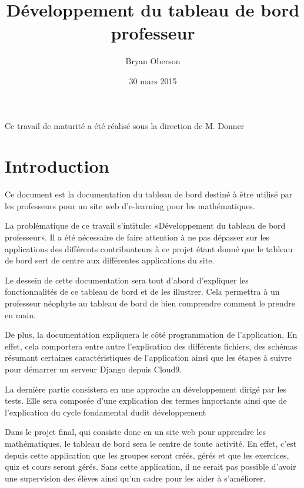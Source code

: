 \documentclass[a4paper,10pt,french]{sphinxmanual}
\title{Développement du tableau de bord professeur}
\date{30 mars 2015}
\author{Bryan Oberson}
\begin{document}
\maketitle
\tableofcontents
{}\label{index::doc}\begin{center}
Ce travail de maturité a été réalisé sous la direction de M. Donner
\end{center}

\setcounter{page}{2}

\chapter{Introduction}
\label{intro:introduction}\label{intro::doc}\label{intro:developpement-du-tableau-de-bord-professeur}
Ce document est la documentation du tableau de bord destiné à
être utilisé par les professeurs pour un site web d'e-learning pour les
mathématiques.

La problématique de ce travail s'intitule: «Développement du tableau de bord
professeur». Il a été nécessaire de faire attention à ne pas dépasser sur les
applications des différents contribuateurs à ce projet étant donné que le
tableau de bord sert de centre aux différentes applications du site.

Le dessein de cette documentation sera tout d'abord d'expliquer les
fonctionnalités de ce tableau de bord et de les illustrer. Cela permettra à un
professeur néophyte au tableau de bord de bien comprendre comment le prendre en
main.

De plus, la documentation expliquera le côté programmation de l'application.
En effet, cela comportera entre autre l'explication des différents fichiers, des
schémas résumant certaines caractéristiques de l'application ainsi que les
étapes à suivre pour démarrer un serveur Django depuis Cloud9.

La dernière partie consistera en une approche au développement dirigé par les
tests. Elle sera composée d'une explication des termes importants ainsi que de
l'explication du cycle fondamental dudit développement

Dans le projet final, qui consiste donc en un site web pour apprendre les
mathématiques, le tableau de bord sera le centre de toute activité. En effet,
c'est depuis cette application que les groupes seront créés, gérés et que les
exercices, quiz et cours seront gérés. Sans cette application, il ne serait
pas possible d'avoir une supervision des élèves ainsi qu'un cadre pour les aider
à s'améliorer.
\end{document}
